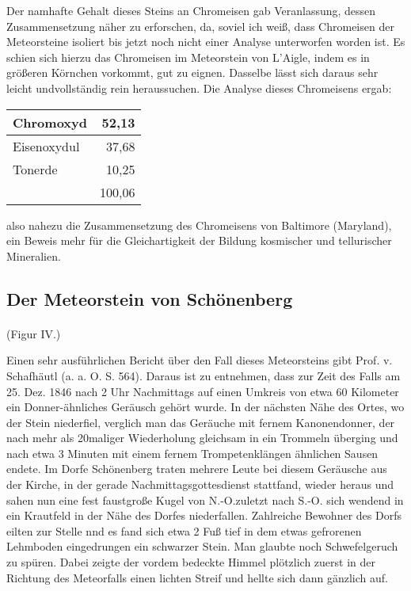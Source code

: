 \documentclass[a4paper, 11pt, oneside]{article}
\begin{document}
Der namhafte Gehalt dieses Steins an Chromeisen gab Veranlassung, dessen Zusammensetzung näher zu erforschen, da, soviel ich weiß, dass Chromeisen der Meteorsteine isoliert bis jetzt noch nicht einer Analyse unterworfen worden ist. Es schien sich hierzu das Chromeisen im Meteorstein von L'Aigle, indem es in größeren Körnchen vorkommt, gut zu eignen. Dasselbe lässt sich daraus sehr leicht undvollständig rein heraussuchen. Die Analyse dieses Chromeisens ergab:
\begin{center}
    \begin{tabular}{ |l|r| } 
    \hline
    Chromoxyd & 52,13\\\hline
    Eisenoxydul & 37,68\\\hline
    Tonerde & 10,25\\\hline
    & 100,06\\
    \hline
    \end{tabular}
\end{center}
also nahezu die Zusammensetzung des Chromeisens von Baltimore (Maryland), ein Beweis mehr für die Gleichartigkeit der Bildung kosmischer und tellurischer Mineralien.
\clearpage
\subsection{Der Meteorstein von Schönenberg}
\paragraph{}
(Figur IV.)

Einen sehr ausführlichen Bericht über den Fall dieses Meteorsteins gibt Prof. v. Schafhäutl (a. a. O. S. 564). Daraus ist zu entnehmen, dass zur Zeit des Falls am 25. Dez. 1846 nach 2 Uhr Nachmittags auf einen Umkreis von etwa 60 Kilometer ein Donner-ähnliches Geräusch gehört wurde. In der nächsten Nähe des Ortes, wo der Stein niederfiel, verglich man das Geräuche mit fernem Kanonendonner, der nach mehr als 20maliger Wiederholung gleichsam in ein Trommeln überging und nach etwa 3 Minuten mit einem fernem Trompetenklängen ähnlichen Sausen endete. Im Dorfe Schönenberg traten mehrere Leute bei diesem Geräusche aus der Kirche, in der gerade Nachmittagsgottesdienst stattfand, wieder heraus und sahen nun eine fest faustgroße Kugel von N.-O.zuletzt nach S.-O. sich wendend in ein Krautfeld in der Nähe des Dorfes niederfallen. Zahlreiche Bewohner des Dorfs eilten zur Stelle nnd es fand sich etwa 2 Fuß tief in dem etwas gefrorenen Lehmboden eingedrungen ein schwarzer Stein. Man glaubte noch Schwefelgeruch zu spüren. Dabei zeigte der vordem bedeckte Himmel plötzlich zuerst in der Richtung des Meteorfalls einen lichten Streif und hellte sich dann gänzlich auf.
\end{document}
